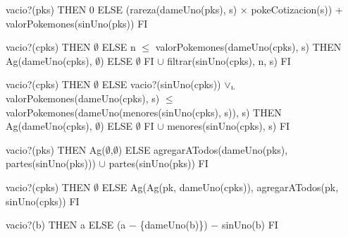 \begin{tad}{}
		{\IF vacio?(pks) THEN
			0
		ELSE
			(rareza(dameUno(pks), s) $\times$ pokeCotizacion(s)) + valorPokemones(sinUno(pks))
		FI}



		{\IF vacio?(cpks) THEN
			$\emptyset$
		ELSE
			{\IF n $\leq$ valorPokemones(dameUno(cpks), s) THEN
				Ag(dameUno(cpks), $\emptyset$)
			ELSE
				$\emptyset$
			FI} $\cup$ filtrar(sinUno(cpks), n, s)
		FI}

		{\IF vacio?(cpks) THEN $\emptyset$ ELSE
			{\IF vacio?(sinUno(cpks)) $\lor_{\mathrm{\scriptscriptstyle{L}}}$ valorPokemones(dameUno(cpks), s) $\leq$ valorPokemones(dameUno(menores(sinUno(cpks), s)), s) THEN
				Ag(dameUno(cpks), $\emptyset$)
			ELSE
				$\emptyset$
			FI} $\cup$ menores(sinUno(cpks), s)
		FI}

		{\IF vacio?(pks) THEN
			Ag($\emptyset$,$\emptyset$)
		ELSE	
			agregarATodos(dameUno(pks), partes(sinUno(pks))) $\cup$ partes(sinUno(pks)) 
		FI}

		{\IF vacio?(cpks) THEN
			$\emptyset$
		ELSE
			Ag(Ag(pk, dameUno(cpks)), agregarATodos(pk, sinUno(cpks))
		FI}


		{\IF vacio?(b) THEN
			a
		ELSE
			(a $-$ \{dameUno(b)\}) $-$ sinUno(b)
		FI}

\end{tad}
